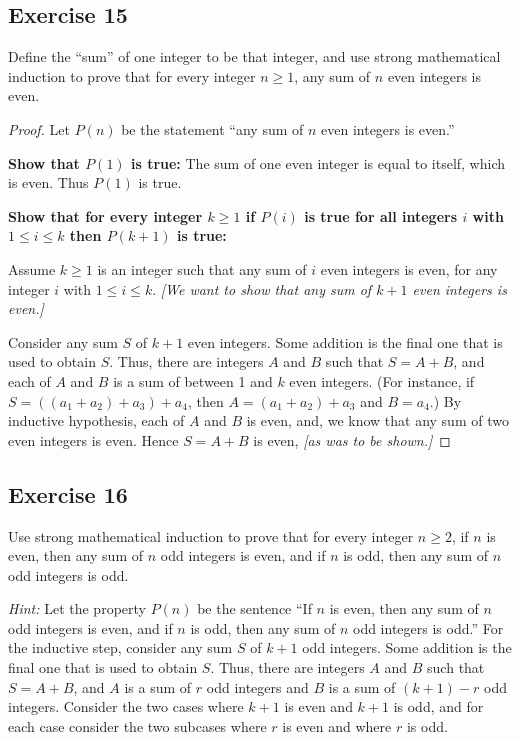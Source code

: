\documentclass[14pt]{extarticle}
\begin{document}
\subsection{Exercise 15}
Define the “sum” of one integer to be that integer, and use strong mathematical induction to prove that for every integer $n \geq 1$, any sum of $n$ even integers is even.

\begin{proof}
    Let $P(n)$ be the statement ``any sum of $n$ even integers is even.''

    {\bf Show that $P(1)$ is true:} The sum of one even integer is equal to itself, which is even. Thus $P(1)$ is true.

        {\bf Show that for every integer $k \geq 1$ if $P(i)$ is true for all integers $i$ with $1 \leq i \leq k$ then $P(k+1)$ is true:}

    Assume $k \geq 1$ is an integer such that any sum of $i$ even integers is even, for any integer $i$ with $1 \leq i \leq k$. {\it [We want to show that any sum of $k+1$ even integers is even.]}

    Consider any sum $S$ of $k+1$ even integers.
    Some addition is the final one that is used to obtain $S$.
    Thus, there are integers $A$ and $B$ such that $S = A + B$,
    and each of $A$ and $B$ is a sum of between 1 and $k$
    even integers.
    (For instance, if $S = ((a_1 + a_2) + a_3) + a_4$, then $A = (a_1 + a_2) + a_3$ and $B = a_4$.)
    By inductive hypothesis, each of $A$ and $B$ is even, and,
    we know that any sum of two even integers is even. Hence $S = A + B$ is even, {\it [as was to be shown.]}
\end{proof}

\subsection{Exercise 16}
Use strong mathematical induction to prove that for every integer $n \geq 2$, if $n$ is even, then any sum of $n$ odd integers is even, and if $n$ is odd, then any sum of $n$ odd integers is odd.

    {\it Hint:} Let the property $P(n)$ be the sentence “If
$n$ is even, then any sum of $n$ odd integers is even,
and if $n$ is odd, then any sum of $n$ odd integers is odd.”
For the inductive step, consider any sum $S$ of $k + 1$ odd integers.
Some addition is the final one that is used to obtain $S$.
Thus, there are integers $A$ and $B$ such that $S = A + B$,
and $A$ is a sum of $r$ odd integers
and $B$ is a sum of $(k + 1) - r$ odd integers.
Consider the two cases where $k + 1$ is even and $k + 1$ is
odd, and for each case consider the two subcases where $r$
is even and where $r$ is odd.
\end{document}

